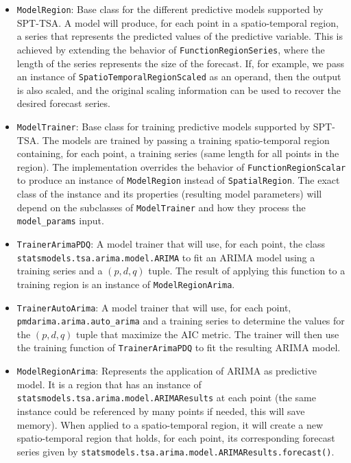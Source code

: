 \begin{itemize}
	\item \texttt{ModelRegion}: Base class for the different predictive models supported by SPT-TSA. A model will produce, for each point in a spatio-temporal region, a series that represents the predicted values of the predictive variable. This is achieved by extending the behavior of \texttt{FunctionRegionSeries}, where the length of the series represents the size of the forecast. If, for example, we pass an instance of \texttt{SpatioTemporalRegionScaled} as an operand, then the output is also scaled, and the  original scaling information can be used to recover the desired forecast series.
	
	\item \texttt{ModelTrainer}: Base class for training predictive models supported by SPT-TSA. The models are trained by passing a training spatio-temporal region containing, for each point, a training series (same length for all points in the region). The implementation overrides the behavior of \texttt{FunctionRegionScalar} to produce an instance of \texttt{ModelRegion} instead of \texttt{SpatialRegion}. The exact class of the instance and its properties (resulting model parameters) will depend on the subclasses of \texttt{ModelTrainer} and how they process the \texttt{model\_params} input.
	
	\item \texttt{TrainerArimaPDQ}: A model trainer that will use, for each point, the class \\ \texttt{statsmodels.tsa.arima.model.ARIMA} to fit an ARIMA model using a training series and a $(p, d, q)$ tuple. The result of applying this function to a training region is an instance of \texttt{ModelRegionArima}.
	
	\item \texttt{TrainerAutoArima}: A model trainer that will use, for each point, \\
	\texttt{pmdarima.arima.auto\_arima} and a training series to determine the values for the $(p, d, q)$ tuple that maximize the AIC metric. The trainer will then use the training function of \texttt{TrainerArimaPDQ} to fit the resulting ARIMA model.
	
	\item \texttt{ModelRegionArima}: Represents the application of ARIMA as predictive model. It is a region that has an instance of \texttt{statsmodels.tsa.arima.model.ARIMAResults} at each point (the same instance could be referenced by many points if needed, this will save memory). When applied to a spatio-temporal region, it will create a new spatio-temporal region that holds, for each point, its corresponding forecast series given by \texttt{statsmodels.tsa.arima.model.ARIMAResults.forecast()}.
	

\end{itemize}
